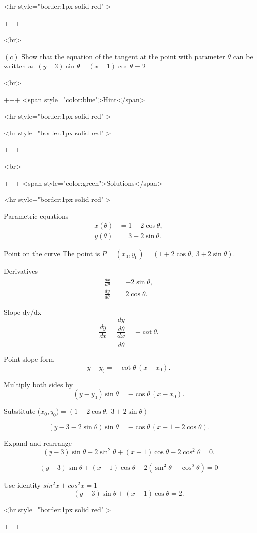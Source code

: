 <hr style="border:1px solid red" >

+++

<br>

\((c)\) Show that the equation of the tangent at the point with parameter $\theta$ can be written as $(y-3) \sin \theta+(x-1) \cos \theta=2$

<br>

+++ <span style="color:blue">Hint</span>

<hr style="border:1px solid red" >

<hr style="border:1px solid red" >

+++

<br>

+++ <span style="color:green">Solutions</span>

<hr style="border:1px solid red" >

Parametric equations
\begin{align*}
x(\theta) &= 1 + 2\cos\theta,\\
y(\theta) &= 3 + 2\sin\theta.
\end{align*}

Point on the curve
The point is $P=(x_0,y_0)=(1+2\cos\theta,\;3+2\sin\theta)$.

Derivatives
\begin{align*}
\frac{dx}{d\theta} &= -2\sin\theta,\\
\frac{dy}{d\theta} &= 2\cos\theta.
\end{align*}

Slope dy/dx
$$
\frac{dy}{dx} = \frac{\dfrac{dy}{d\theta}}{\dfrac{dx}{d\theta}} = -\cot\theta.
$$


Point-slope form
$$
y - y_0 = -\cot\theta\,(x-x_0).
$$

Multiply both sides by \sin\theta
$$
(y-y_0)\sin\theta = -\cos\theta\,(x-x_0).
$$

Substitute ($x_0,y_0)=(1+2\cos\theta,\;3+2\sin\theta)$

$$
(y-3-2\sin\theta)\sin\theta = -\cos\theta\,(x-1-2\cos\theta).
$$


Expand and rearrange
$$
(y-3)\sin\theta - 2\sin^2\theta + (x-1)\cos\theta - 2\cos^2\theta = 0.
$$

$$
(y-3)\sin\theta + (x-1)\cos\theta - 2(\sin^2\theta+\cos^2\theta) = 0
$$

Use identity $sin^2x+cos^2x=1$
$$
(y-3)\sin\theta + (x-1)\cos\theta = 2.
$$

<hr style="border:1px solid red" >

+++

